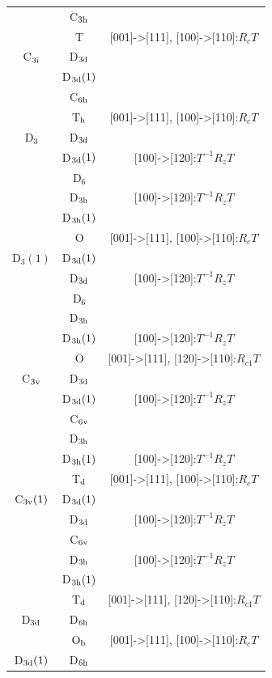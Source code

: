 \documentclass[11pt]{easymemo}
\begin{document}
\begin{table}[t]
\begin{center}
\begin{tabular}{ccc}
   & C$_{\rm 3h}$ & \\
   & T & [001]->[111], [100]->[110]:$R_cT$ \\ \hline
C$_{\rm 3i}$ & D$_{\rm 3d}$ & \\
    & D$_{\rm 3d}(1)$ & \\
    & C$_{\rm 6h}$ & \\
    & T$_{\rm h}$ & [001]->[111], [100]->[110]:$R_cT$ \\ \hline
D$_3$ & D$_{\rm 3d}$ & \\
   & D$_{\rm 3d}(1)$ & [100]->[120]:$T^{-1} R_z T$ \\
   & D$_6$ & \\
   & D$_{\rm 3h}$ & [100]->[120]:$T^{-1} R_z T$ \\
   & D$_{\rm 3h}(1)$ & \\
   & O & [001]->[111], [100]->[110]:$R_cT$ \\ \hline
D$_3(1)$ & D$_{\rm 3d}(1)$ & \\
     & D$_{\rm 3d}$ & [100]->[120]:$T^{-1} R_z T$ \\
     & D$_6$ & \\
     & D$_{\rm 3h}$ & \\
     & D$_{\rm 3h}(1)$ & [100]->[120]:$T^{-1} R_z T$ \\
     & O & [001]->[111], [120]->[110]:$R_{c1}T$ \\ \hline
C$_{\rm 3v}$ & D$_{\rm 3d}$ & \\
    & D$_{\rm 3d}(1)$ & [100]->[120]:$T^{-1} R_z T$ \\
    & C$_{\rm 6v}$ & \\
    & D$_{\rm 3h}$ & \\
    & D$_{\rm 3h}(1)$ & [100]->[120]:$T^{-1} R_z T$ \\
    & T$_{\rm d}$ & [001]->[111], [100]->[110]:$R_cT$ \\ \hline
C$_{\rm 3v}(1)$ & D$_{\rm 3d}(1)$ & \\
      & D$_{\rm 3d}$ & [100]->[120]:$T^{-1} R_z T$ \\
      & C$_{\rm 6v}$ & \\
      & D$_{\rm 3h}$ & [100]->[120]:$T^{-1} R_z T$ \\
      & D$_{\rm 3h}(1)$ & \\
      & T$_{\rm d}$ & [001]->[111], [120]->[110]:$R_{c1}T$ \\ \hline
D$_{\rm 3d}$ & D$_{\rm 6h}$ & \\
    & O$_{\rm h}$ & [001]->[111], [100]->[110]:$R_cT$ \\ \hline
D$_{\rm 3d}(1)$ & D$_{\rm 6h}$ & \\

\end{tabular}
\end{center}
\end{table}
\end{document}
